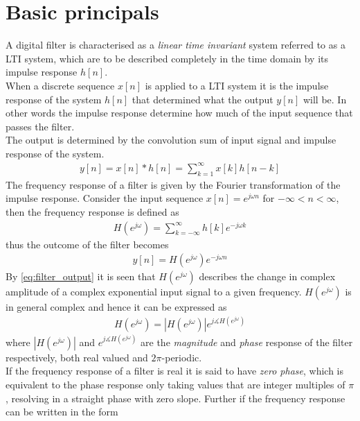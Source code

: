 \section{Basic principals}\label{sec:basic_filter}

A digital filter is characterised as a \textit{linear time invariant} system referred to as a LTI system, which are to be described completely in the time domain by its impulse response $h[n]$. \\
When a discrete sequence $x[n]$ is applied to a LTI system it is the impulse response of the system $h[n]$ that determined what the output $y[n]$ will be. In other words the impulse response determine how much of the input sequence that passes the filter. \\ 
The output is determined by the convolution sum of input signal and impulse response of the system.
\begin{align}
y[n] = x[n]*h[n] = \sum_{k=1}^{\infty} x[k]h[n-k]
\end{align}    
The frequency response of a filter is given by the Fourier transformation of the impulse response. Consider the input sequence $x[n]=e^{j\omega n}$ for $-\infty < n <\infty$, then the frequency response is defined as
\begin{align}\label{eq:freq_res}
H(e^{j\omega})=\sum_{k=-\infty}^{\infty}h[k]e^{-j\omega k}
\end{align}
thus the outcome of the filter becomes 
\begin{align}
y[n]=H(e^{j\omega})e^{-j\omega n} \label{eq:filter_output}
\end{align} 
By \eqref{eq:filter_output} it is seen that $H(e^{j\omega})$ describes the change in complex amplitude of a complex exponential input signal to a given frequency. $H(e^{j\omega})$ is in general complex and hence it can be expressed as
\begin{align}
H(e^{j\omega})=|H(e^{j\omega})|e^{j\measuredangle H(e^{j\omega})}
\end{align}  
where $|H(e^{j\omega})|$ and $e^{j\measuredangle H(e^{j\omega})}$ are the \textit{magnitude} and \textit{phase} response of the filter respectively, both real valued and $2\pi$-periodic.\\ 
If the frequency response of a filter is real it is said to have \textit{zero phase}, which is equivalent to the phase response only taking values that are integer multiples of $\pi$, resolving in a straight phase with zero slope.   Further if the frequency response can be written in the form 
